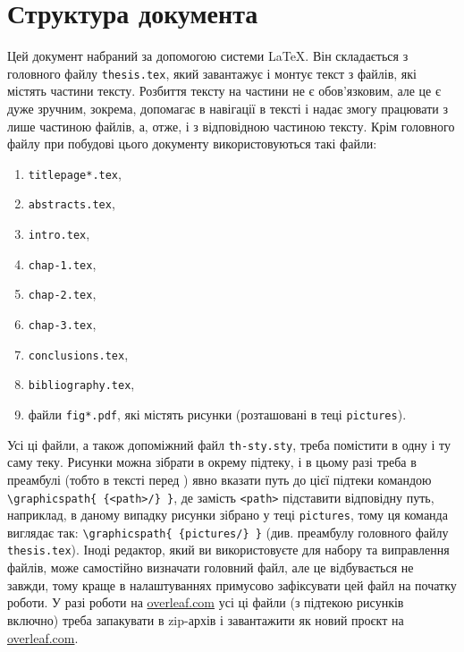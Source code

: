 \section*{Структура документа} 

Цей документ набраний за допомогою системи \LaTeX. Він складається з головного файлу {\color{bluegreen}\verb|thesis.tex|}, який завантажує і монтує текст з файлів, які містять частини тексту. Розбиття тексту на частини не є обов'язковим, але це є дуже зручним, зокрема, допомагає в навігації в тексті і надає змогу працювати з лише частиною файлів, а, отже, і з відповідною частиною тексту. Крім головного файлу при побудові цього документу використовуються такі файли:
\begin{enumerate}[label={\upshape(\roman*)}, leftmargin=5.5ex, labelwidth=5.5ex] 
\item 
	{\color{bluegreen}\verb|titlepage*.tex|},
\item 
	{\color{bluegreen}\verb|abstracts.tex|},
\item
	{\color{bluegreen}\verb|intro.tex|},
\item
	{\color{bluegreen}\verb|chap-1.tex|},
\item
	{\color{bluegreen}\verb|chap-2.tex|},
\item
	{\color{bluegreen}\verb|chap-3.tex|},
\item
	{\color{bluegreen}\verb|conclusions.tex|},
\item 
	{\color{bluegreen}\verb|bibliography.tex|},
\item
	файли {\color{bluegreen}\verb|fig*.pdf|}, які містять рисунки (розташовані в теці {\color{bluegreen}\verb|pictures|}).
\end{enumerate}
Усі ці файли, а також допоміжний файл {\color{bluegreen}\verb|th-sty.sty|}, треба помістити в одну і ту саму  теку. Рисунки можна зібрати в окрему підтеку, і в цьому разі треба в преамбулі (тобто в тексті перед {\color{bluegreen}\verb||}) явно вказати путь до цієї підтеки командою {\color{bluegreen}\verb|\graphicspath{ {<path>/} }|}, де замість {\color{bluegreen}\verb|<path>|} підставити відповідну путь, наприклад, в даному випадку рисунки зібрано у теці {\color{bluegreen}\verb|pictures|}, тому ця команда виглядає так:
{\color{bluegreen}\verb|\graphicspath{ {pictures/} }|} (див. преамбулу головного файлу {\color{bluegreen}\verb|thesis.tex|}). Іноді редактор, який ви використовуєте для набору та виправлення файлів, може самостійно визначати головний файл, але це відбувається не завжди, тому краще в налаштуваннях примусово зафіксувати цей файл на початку роботи.  У разі роботи на \url{overleaf.com} усі ці файли (з підтекою рисунків включно) треба запакувати в zip-архів і завантажити як новий проєкт на \url{overleaf.com}. 

